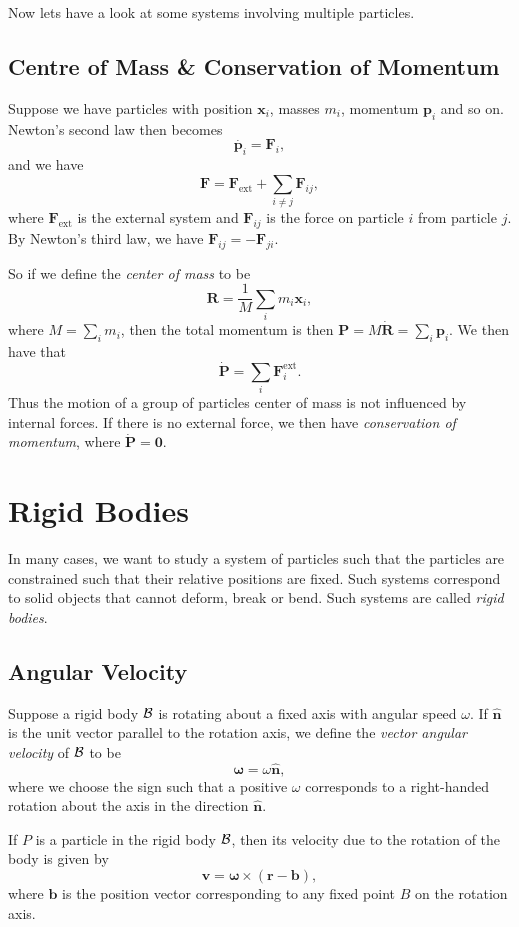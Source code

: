 \documentclass[11pt, a4paper]{scrartcl}
\newcommand{\vv}[1]{\boldsymbol{\mathbf{#1}}}
\theoremstyle{definition}
\newcommand{\hh}[1]{\hat{\vv{#1}}}
\begin{document}
Now lets have a look at some systems involving multiple particles.

\subsection*{Centre of Mass \& Conservation of Momentum}

Suppose we have particles with position $\vv x_i$, masses $m_i$, momentum $\vv p_i$ and so on. Newton's second law then becomes
$$
\dot{\vv p_i} = \vv F_i,
$$
and we have
$$
\vv F = \vv F_{\text{ext}} + \sum_{i \neq j} \vv F_{ij},
$$
where $\vv F_{\text{ext}}$ is the external system and $\vv F_{ij}$ is the force on particle $i$ from particle $j$. By Newton's third law, we have $\vv F_{ij} = - \vv F_{ji}$.

So if we define the \emph{center of mass} to be
$$
\vv R = \frac{1}{M} \sum_i m_i \vv x_i,
$$
where $M = \sum_i m_i$, then the total momentum is then $\vv P = M \dot{\vv R} = \sum_{i} \vv p_i$. We then have that
$$
\dot{\vv P} = \sum_i \vv F_i^{\text{ext}}.
$$
Thus the motion of a group of particles center of mass is not influenced by internal forces. If there is no external force, we then have \emph{conservation of momentum}, where $\dot{\vv P} = \vv 0$.


\clearpage

\section{Rigid Bodies}


In many cases, we want to study a system of particles such that the particles are constrained such that their relative positions are fixed. Such systems correspond to solid objects that cannot deform, break or bend. 
Such systems are called \emph{rigid bodies}.

\subsection*{Angular Velocity}

Suppose a rigid body $\mathcal{B}$ is rotating about a fixed axis with angular speed $\omega$. If $\hh n$ is the unit vector parallel to the rotation axis, we define the \emph{vector angular velocity} of $\mathcal{B}$ to be
$$
\vv \omega = \omega \hh n,
$$
where we choose the sign such that a positive $\omega$ corresponds to a right-handed rotation about the axis in the direction $\hh n$.

If $P$ is a particle in the rigid body $\mathcal{B}$, then its velocity due to the rotation of the body is given by
$$
\vv v = \vv \omega \times (\vv r - \vv b),
$$
where $\vv b$ is the position vector corresponding to any fixed point $B$ on the rotation axis.
\end{document}

